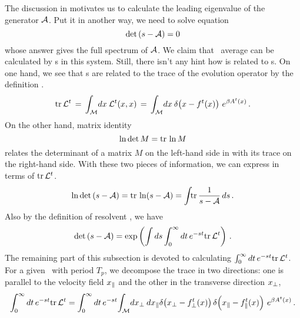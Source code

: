 The discussion in  motivates us to calculate the leading
eigenvalue of the generator $\mathcal{A}$. Put it in another way, we need to
solve equation
\begin{equation}
  \label{eq:Adet}
  \mathrm{det}\,(s - \mathcal{A}) = 0
\end{equation}
whose answer gives the full spectrum of $\mathcal{A}$.
We claim that \spt\ average can be calculated by \po s in
this system. Still, there isn't any hint
how  is related to \po s.
On one hand, we see that \po s are related to the trace of the evolution operator
by the definition .
\begin{equation}
  \label{eq:trL}
  \mathrm{tr}\,\mathcal{L}^t \,=\,
  {\int_{\mathcal{M}}{\!d x}\:}\mathcal{L}^t(x, x)\,=\,
  {\int_{\mathcal{M}}{\!d x}\:} \delta\negthinspace\left( {x- {f^{t}(x)}} \right)\, e^{\beta A^t(x)}
  \,.
\end{equation}
On the other hand, matrix identity
\begin{equation}
  \label{eq:Miden}
  \ln\mathrm{det}\, M = \mathrm{tr}\, \ln M
\end{equation}
relates the determinant of a matrix $M$ on the left-hand side
in  with its
trace on the right-hand side. With these two pieces of information,
we can express  in terms of $\mathrm{tr}\,\mathcal{L}^t$.
\begin{equation}
  \label{eq:trace}
  \ln \mathrm{det}\, (s  - \mathcal{A})
  = \mathrm{tr}\, \ln (s - \mathcal{A}) = \int_{} \mathrm{tr}\,  \frac{1}{s - \mathcal{A}}  \, ds
  \,.
\end{equation}
Also by the definition of resolvent , we have
\begin{equation}
  \label{eq:Adet2}
  \mathrm{det}\, (s - \mathcal{A}) = \exp
  \left(\int ds \int_0^\infty dt \, e^{-st} \mathrm{tr}\,\mathcal{L}^t \right)
  \,.
\end{equation}
The remaining part of this subsection is devoted to calculating
$\int_0^\infty dt \, e^{-st} \mathrm{tr}\,\mathcal{L}^t$. For a given \po\ with period
$T_p$, we decompose the trace  in two directions: one
is parallel to the velocity field $x_{\parallel}$ and the other in the
transverse direction $x_{\perp}$,
\[
  \int_0^\infty dt \, e^{-st} \mathrm{tr}\,\mathcal{L}^t =
  \int_0^\infty dt \, e^{-st}
  {\int_{\mathcal{M}}{\!d x_{\perp}}\:} dx_{\parallel} \delta\negthinspace\left( {x_{\perp}- f^t_{\perp}(x)} \right)
  \delta\negthinspace\left( {x_{\parallel}- f^t_{\parallel}(x)} \right)
  \, e^{\beta A^t(x)}
  \,.
\]

